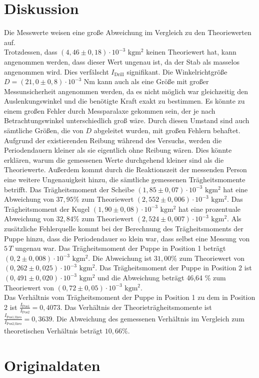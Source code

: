 \section{Diskussion}
\label{sec:Diskussion}
Die Messwerte weisen eine große Abweichung im Vergleich zu den Theoriewerten auf.  \\
Trotzdessen, dass $(4,46 \pm 0,18) \cdot 10^{-3} \,\,\unit{\kilo\gram\meter\squared}$ keinen Theoriewert hat, kann angenommen werden, dass 
dieser Wert ungenau ist, da der Stab 
als masselos angenommen wird. Dies verfälscht $I_{\text{Drill}}$ signifikant. Die Winkelrichtgröße 
$D = (21,0 \pm 0,8) \cdot 10^{-3} \,\,\unit{\newton\meter}$ kann auch als eine Größe mit großer Messunsicherheit angenommen
werden, da es nicht möglich war gleichzeitig den Auslenkungswinkel und die benötigte Kraft exakt zu bestimmen. Es könnte zu einem großen 
Fehler durch Messparalaxe gekommen sein, der je nach Betrachtungswinkel unterschiedlich groß wäre. Durch diesen Umstand sind auch sämtliche 
Größen, die von $D$ abgeleitet wurden, mit großen Fehlern behaftet. \\
Aufgrund der existierenden Reibung während des Versuchs, werden die 
Periodendauern kleiner als sie eigentlich ohne Reibung wären. Dies könnte erklären, warum die gemessenen Werte durchgehend kleiner sind als die 
Theoriewerte. Außerdem kommt durch die Reaktionszeit der messenden Person eine weitere Ungenauigkeit hinzu, die sämtliche gemessenen 
Trägheitsmomente betrifft.
Das Trägheitsmoment der Scheibe $(1,85 \pm 0,07) \cdot 10^{-3} \,\,\unit{\kilo\gram\meter\squared}$ hat eine Abweichung von $37,95 \%$ 
zum Theoriewert $(2,552 \pm 0,006) \cdot 10^{-3} \,\,\unit{\kilo\gram\meter\squared}$.
Das Trägheitsmoment der Kugel $(1,90 \pm 0,08) \cdot 10^{-3} \,\,\unit{\kilo\gram\meter\squared}$ hat eine prozentuale 
Abweichung von $32,84 \%$ zum Theoriewert $(2,524 \pm 0,007) \cdot 10^{-3} \,\,\unit{\kilo\gram\meter\squared}$. 
Als zusätzliche Fehlerquelle kommt bei der Berechnung des Trägheitsmoments der Puppe hinzu, dass die Periodendauer so klein war, dass selbst eine
Messung von $5\,T$ ungenau war. Das Trägheitsmoment der Puppe in Position 1 beträgt $(0,2 \pm 0,008) \cdot 10^{-3}\,\, \unit{\kilo\gram\meter\squared}$.
 Die Abweichung ist $31,00 \%$ zum Theoriewert von $(0,262 \pm 0,025) \cdot 10^{-3}\,\, \unit{\kilo\gram\meter\squared}$.
Das Trägheitsmoment der Puppe in Position 2 ist $ (0,491 \pm 0,020) \cdot 10^{-3}\,\, \unit{\kilo\gram\meter\squared}$ und die Abweichung beträgt 46,64 \% zum Theoriewert 
von $(0,72 \pm 0,05) \cdot 10^{-3}\,\, \unit{\kilo\gram\meter\squared}$.\\
Das Verhältnis vom Trägheitsmoment der Puppe in Position 1 zu dem in Position 2 ist $\frac{I_{\text{Pos1}}}{I_{\text{Pos2}}} = 0,4073$. Das
Verhältnis der Theorieträgheitsmomente ist $\frac{I_{\text{Pos1,theo}}}{I_{\text{Pos2,theo}}} = 0,3639$. Die Abweichung des gemessenen Verhältnis im
Vergleich zum theoretischen Verhältnis beträgt $10,66 \%$. 
 
\section{Originaldaten}
\label{sec:Originaldaten}
